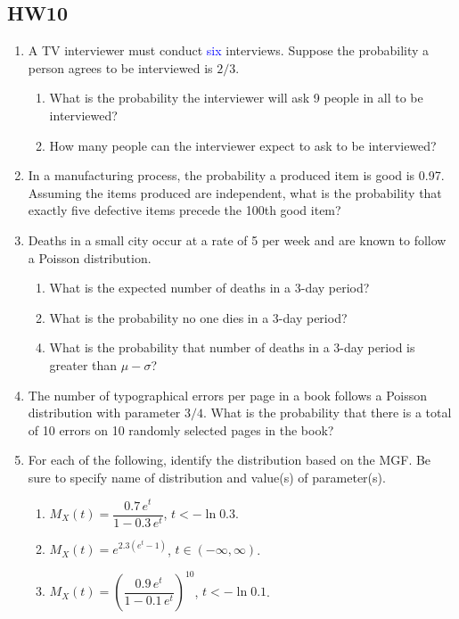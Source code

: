 \documentclass[12pt]{article}
\begin{document}
\subsection*{HW10}

\begin{enumerate}
  \item A TV interviewer must conduct \textcolor{blue}{six} interviews. Suppose the probability a person agrees to be interviewed is $2/3$.
    \begin{enumerate}[label=(\alph*)]
      \item What is the probability the interviewer will ask 9 people in all to be interviewed?
      \item How many people can the interviewer expect to ask to be interviewed?
    \end{enumerate}

\newpage

  \item In a manufacturing process, the probability a produced item is good is 0.97. Assuming the items produced are independent, what is the probability that exactly five defective items precede the 100th good item?

\newpage

  \item Deaths in a small city occur at a rate of 5 per week and are known to follow a Poisson distribution.
    \begin{enumerate}[label=(\alph*)]
      \item What is the expected number of deaths in a 3-day period?
      \item What is the probability no one dies in a 3-day period?
    \end{enumerate}
    \begin{enumerate}[label=(\alph*)]
      \setcounter{enumii}{3}
      \item What is the probability that number of deaths in a 3-day period is greater than $\mu - \sigma$?
    \end{enumerate}

\newpage

  \item The number of typographical errors per page in a book follows a Poisson distribution with parameter $3/4$. What is the probability that there is a total of 10 errors on 10 randomly selected pages in the book?

\newpage

  \item For each of the following, identify the distribution based on the MGF. Be sure to specify name of distribution and value(s) of parameter(s).
    \begin{enumerate}[label=(\alph*)]
      \item $M_X(t) = \dfrac{0.7\,e^{t}}{1 - 0.3\,e^{t}}$, $t < -\ln 0.3$.
      \item $M_X(t) = e^{2.3(e^{t} - 1)}$, $t \in (-\infty, \infty)$.
      \item $M_X(t) = \left(\dfrac{0.9\,e^{t}}{1 - 0.1\,e^{t}}\right)^{10}$, $t < -\ln 0.1$.
    \end{enumerate}

\end{enumerate}
\end{document}
